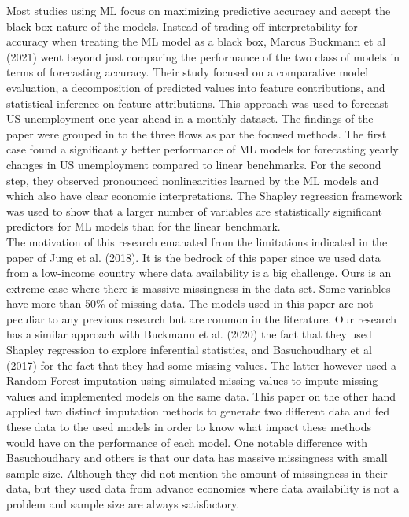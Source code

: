 \documentclass[12pt,italian, twoside]{report}
\begin{document}
Most studies using ML focus on maximizing predictive accuracy and accept the black box nature of the models. Instead of trading off interpretability for accuracy when treating the ML model as a black box, Marcus Buckmann et al (2021) went beyond just comparing the performance of the two class of models in terms of forecasting accuracy. Their study focused on a comparative model evaluation, a decomposition of predicted values into feature contributions, and statistical inference on feature attributions. This approach was used to forecast US unemployment one year ahead in a monthly dataset. The findings of the paper were grouped in to the three flows as par the focused methods. The first case found a significantly better performance of ML models for forecasting yearly changes in US unemployment compared to linear benchmarks. For the second step, they observed pronounced nonlinearities learned by the ML models and which also have clear economic interpretations. The Shapley regression framework was used to show that a larger number of variables are statistically significant predictors for ML models than for the linear benchmark.\\ 
The motivation of this research emanated from the limitations indicated in the paper of Jung et al. (2018). It is the bedrock of this paper since we used data from a low-income country where data availability is a big challenge. Ours is an extreme case where there is massive missingness in the data set. Some variables have more than 50\% of missing data. The models used in this paper are not peculiar to any previous research but are common in the literature. Our research has a similar approach with Buckmann et al. (2020) the fact that they used Shapley regression to explore inferential statistics, and Basuchoudhary et al (2017) for the fact that they had some missing values. The latter however used a Random Forest imputation using simulated missing values to impute missing values and implemented models on the same data. This paper on the other hand applied two distinct imputation methods to generate two different data and fed these data to the used models in order to know what impact these methods would have on the performance of each model. One notable difference with Basuchoudhary and others is that our data has massive missingness with small sample size. Although they did not mention the amount of missingness in their data, but they used data from advance economies where data availability is not a problem and sample size are always satisfactory. \\
\end{document}
